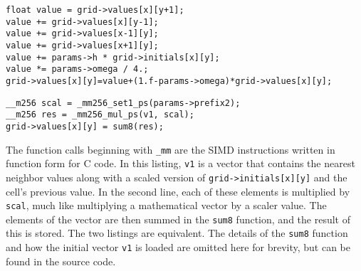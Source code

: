 \vspace{5mm}

\begin{minipage}{\linewidth}
\begin{lstlisting}[frame=single,label=lst:normal,caption={Iteration code (simplified) for a single cell. Also notice that this code uses structure-of-arrays data layout.}]
float value = grid->values[x][y+1];
value += grid->values[x][y-1];
value += grid->values[x-1][y];
value += grid->values[x+1][y];
value += params->h * grid->initials[x][y];
value *= params->omega / 4.;
grid->values[x][y]=value+(1.f-params->omega)*grid->values[x][y];
\end{lstlisting}
\end{minipage}

\begin{minipage}{\linewidth}
\begin{lstlisting}[frame=single,label=lst:simd-normal,caption={SIMD version of iteration code for a single cell. The loading of the initial vector is not shown for simplicity.}]
__m256 scal = _mm256_set1_ps(params->prefix2);
__m256 res = _mm256_mul_ps(v1, scal);
grid->values[x][y] = sum8(res);
\end{lstlisting}
\end{minipage}

The function calls beginning with \texttt{\_mm} are the SIMD instructions written in function form for C code. In this listing, \texttt{v1} is a vector that contains
the nearest neighbor values along with a scaled version of \texttt{grid->initials[x][y]} and the cell's previous value. In the second line, each of these elements is
multiplied by \texttt{scal}, much like multiplying a mathematical vector by a scaler value. The elements of the vector are then summed in the \texttt{sum8} function,
and the result of this is stored. The two listings are equivalent. The details of the \texttt{sum8} function and how the initial vector \texttt{v1} is loaded are
omitted here for brevity, but can be found in the source code.

